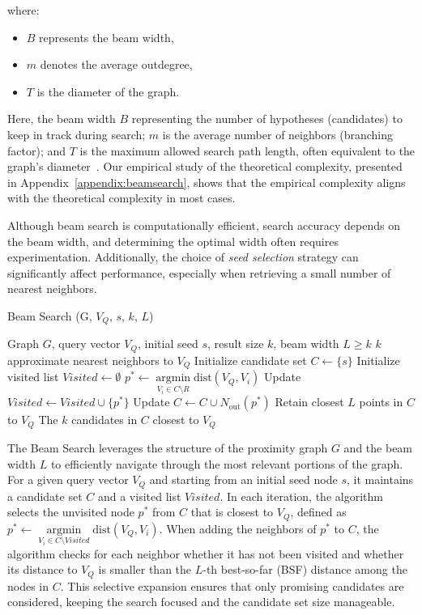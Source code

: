 where:
\begin{itemize}
   \item \( B \) represents the beam width,
   \item \( m \) denotes the average outdegree,
   \item \( T \) is the diameter of the graph.
\end{itemize}

Here, the beam width \(B\)  representing the number of hypotheses (candidates)  to keep in track during search; \(m\) is the average number of neighbors (branching factor); and \(T\) is the maximum allowed search path length, often equivalent to the graph's diameter~\cite{beamsearch}. Our empirical study of the theoretical complexity, presented in Appendix~\ref{appendix:beamsearch}, shows that the empirical complexity aligns with the theoretical complexity in most cases.

Although beam search is computationally efficient, search accuracy depends on the beam width, and determining the optimal width often requires experimentation. Additionally, the choice of \textit{seed selection} strategy can significantly affect performance, especially when retrieving a small number of nearest neighbors.


\begin{algorithm}[tb]
\small
\caption{Beam Search (G, $V_Q$, $s$, $k$, $L$)}\label{alg:beamsearch}
\begin{algorithmic}[1]
    \Require Graph $G$, query vector $V_Q$, initial seed $s$, result size $k$, beam width $L \geq k$
    \Ensure $k$ approximate nearest neighbors to $V_Q$
    \State Initialize candidate set $C \gets \{s\}$
    \State Initialize visited list $Visited \gets \emptyset$
        \State $p^{*} \gets \operatorname*{argmin}\limits_{V_i \in C \setminus R} \text{dist}(V_Q, V_i)$
        \State Update $Visited \gets Visited \cup \{p^{*}\}$
        \State Update $C \gets C \cup N_{\text{out}}(p^*)$        
            \State Retain closest $L$ points in $C$ to $V_Q$
        \EndIf
    \EndWhile
    \State \Return The $k$ candidates in $C$ closest to $V_Q$
\end{algorithmic}
\end{algorithm}

The Beam Search leverages the structure of the proximity graph $G$ and the beam width \( L \) to efficiently navigate through the most relevant portions of the graph. For a given query vector $V_Q$ and starting from an initial seed node $s$, it maintains a candidate set $C$ and a visited list $Visited$. In each iteration, the algorithm selects the unvisited node $p^*$ from $C$ that is closest to $V_Q$, defined as $p^{*} \gets \operatorname*{argmin}\limits_{V_i \in C \setminus Visited} \text{dist}(V_Q, V_i)$. When adding the neighbors of $p^*$ to $C$, the algorithm checks for each neighbor whether it has not been visited and whether its distance to $V_Q$ is smaller than the $L$-th best-so-far (BSF) distance among the nodes in $C$. This selective expansion ensures that only promising candidates are considered, keeping the search focused and the candidate set size manageable.

